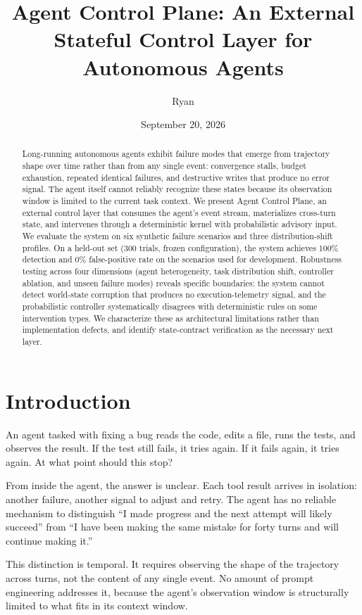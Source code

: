 \documentclass[11pt,a4paper]{article}
\title{Agent Control Plane: An External Stateful Control Layer for Autonomous Agents}
\author{Ryan}
\date{September 20, 2026}
\begin{document}
\maketitle

\begin{abstract}
Long-running autonomous agents exhibit failure modes that emerge from trajectory shape over time rather than from any single event: convergence stalls, budget exhaustion, repeated identical failures, and destructive writes that produce no error signal. The agent itself cannot reliably recognize these states because its observation window is limited to the current task context. We present Agent Control Plane, an external control layer that consumes the agent's event stream, materializes cross-turn state, and intervenes through a deterministic kernel with probabilistic advisory input. We evaluate the system on six synthetic failure scenarios and three distribution-shift profiles. On a held-out set (300 trials, frozen configuration), the system achieves 100\% detection and 0\% false-positive rate on the scenarios used for development. Robustness testing across four dimensions (agent heterogeneity, task distribution shift, controller ablation, and unseen failure modes) reveals specific boundaries: the system cannot detect world-state corruption that produces no execution-telemetry signal, and the probabilistic controller systematically disagrees with deterministic rules on some intervention types. We characterize these as architectural limitations rather than implementation defects, and identify state-contract verification as the necessary next layer.
\end{abstract}

\section{Introduction}

An agent tasked with fixing a bug reads the code, edits a file, runs the tests, and observes the result. If the test still fails, it tries again. If it fails again, it tries again. At what point should this stop?

From inside the agent, the answer is unclear. Each tool result arrives in isolation: another failure, another signal to adjust and retry. The agent has no reliable mechanism to distinguish ``I made progress and the next attempt will likely succeed'' from ``I have been making the same mistake for forty turns and will continue making it.''

This distinction is temporal. It requires observing the shape of the trajectory across turns, not the content of any single event. No amount of prompt engineering addresses it, because the agent's observation window is structurally limited to what fits in its context window.
\end{document}
